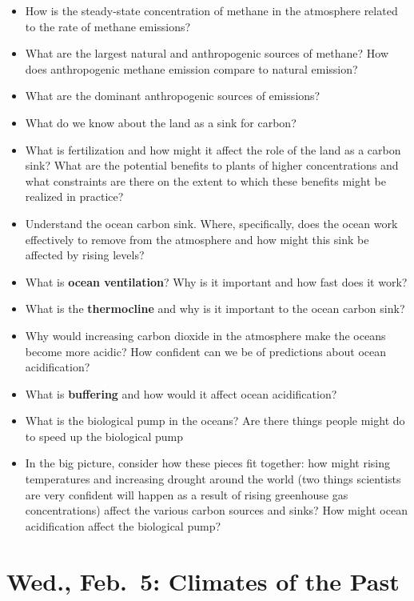 \documentclass[
]{article}
\providecommand{\tightlist}{%
  \setlength{\itemsep}{0pt}\setlength{\parskip}{0pt}}
\newcommand{\COO}{\ce{CO2}}
\begin{document}
\begin{itemize}
\tightlist
\item
  How is the steady-state concentration of methane in the atmosphere
  related to the rate of methane emissions?
\item
  What are the largest natural and anthropogenic sources of methane? How
  does anthropogenic methane emission compare to natural emission?
\item
  What are the dominant anthropogenic sources of \COO{} emissions?
\item
  What do we know about the land as a sink for carbon?
\item
  What is \COO{} fertilization and how might it affect the role of the
  land as a carbon sink? What are the potential benefits to plants of
  higher \COO{} concentrations and what constraints are there on the
  extent to which these benefits might be realized in practice?
\item
  Understand the ocean carbon sink. Where, specifically, does the ocean
  work effectively to remove \COO{} from the atmosphere and how might
  this sink be affected by rising \COO{} levels?
\item
  What is \textbf{ocean ventilation}? Why is it important and how fast
  does it work?
\item
  What is the \textbf{thermocline} and why is it important to the ocean
  carbon sink?
\item
  Why would increasing carbon dioxide in the atmosphere make the oceans
  become more acidic? How confident can we be of predictions about ocean
  acidification?
\item
  What is \textbf{buffering} and how would it affect ocean
  acidification?
\item
  What is the biological pump in the oceans? Are there things people
  might do to speed up the biological pump
\item
  In the big picture, consider how these pieces fit together: how might
  rising temperatures and increasing drought around the world (two
  things scientists are very confident will happen as a result of rising
  greenhouse gas concentrations) affect the various carbon sources and
  sinks? How might ocean acidification affect the biological pump?
\end{itemize}

\hypertarget{wed.-feb.-5-climates-of-the-past}{%
\section{Wed., Feb.~5: Climates of the
Past}\label{wed.-feb.-5-climates-of-the-past}}
\end{document}
